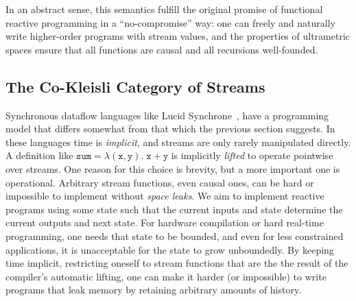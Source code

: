 \documentclass[nocopyrightspace,preprint]{sigplanconf}
\newcommand{\term}[1]{\ensuremath{\mathtt{{#1}}}}
\newcommand{\fun}[2]{\lambda {#1}.\;{#2}}
\begin{document}
\noindent In an abstract sense, this semantics fulfill the original
promise of functional reactive programming in a ``no-compromise'' way:
one can freely and naturally write higher-order programs with stream
values, and the properties of ultrametric spaces ensure that all
functions are causal and all recursions well-founded.

\subsection{The Co-Kleisli Category of Streams}
Synchronous dataflow languages like Lucid Synchrone~\cite{synchrone},
have a programming model that differs somewhat from that which the
previous section suggests.  In these languages time is
\emph{implicit}, and streams are only rarely manipulated directly. A
definition like $\term{sum = \fun{(x,y)}{x + y}}$ is implicitly
\emph{lifted} to operate pointwise over streams.  One reason for this
choice is brevity, but a more important one is operational. Arbitrary
stream functions, even causal ones, can be hard or impossible to
implement without \emph{space leaks}. We aim to implement reactive
programs using some state such that the current inputs and state
determine the current outputs and next state. For hardware compilation
or hard real-time programming, one needs that state to be bounded, and
even for less constrained applications, it is unacceptable for the
state to grow unboundedly. By keeping time implicit, restricting
oneself to stream functions that are the the result of the compiler's
automatic lifting, one can make it harder (or impossible) to write
programs that leak memory by retaining arbitrary amounts of history.


\end{document}
